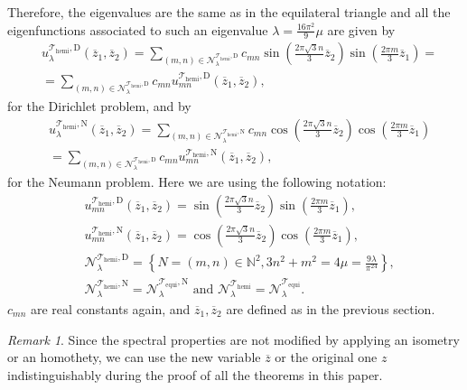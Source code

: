 \documentclass{amsart}
\theoremstyle{definition}
\theoremstyle{remark}
\newtheorem{remark}[theorem]{Remark}
\numberwithin{equation}{section}
\theoremstyle{definition}
\theoremstyle{remark}
\begin{document}
Therefore, the eigenvalues are the same as in the equilateral triangle and all the eigenfunctions associated to such an eigenvalue $\lambda=\frac{16\pi^2}{9}\mu$ are given by
\begin{equation}
	\begin{aligned}
		&	u_\lambda^{\mathcal{T}_\mathrm{hemi},\mathrm{D}}\left(\overline{z}_1,\overline{z}_2\right)=\sum_{(m,n)\in	\mathcal{N}_\lambda^{\mathcal{T}_\mathrm{hemi},\mathrm{D}}}c_{mn}\sin\left(\frac{2\pi\sqrt{3}n}{3}\overline{z}_2\right)\sin\left(\frac{2\pi m}{3}\overline{z}_1\right)=\\&=\sum_{(m,n)\in	\mathcal{N}_\lambda^{\mathcal{T}_\mathrm{hemi},\mathrm{D}}}c_{mn}u_{mn}^{\mathcal{T}_\mathrm{hemi},\mathrm{D}}\left(\overline{z}_1,\overline{z}_2\right),
	\end{aligned}
\end{equation}for the Dirichlet problem, and by 
\begin{equation}
	\begin{aligned}
		&	u_\lambda^{\mathcal{T}_\mathrm{hemi},\mathrm{N}}\left(\overline{z}_1,\overline{z}_2\right)=\sum_{(m,n)\in	\mathcal{N}_\lambda^{\mathcal{T}_\mathrm{hemi},\mathrm{N}}}c_{mn}\cos\left(\frac{2\pi\sqrt{3}n}{3}\overline{z}_2\right)\cos\left(\frac{2\pi m}{3}\overline{z}_1\right)\\&=\sum_{(m,n)\in	\mathcal{N}_\lambda^{\mathcal{T}_\mathrm{hemi},\mathrm{D}}}c_{mn}u_{mn}^{\mathcal{T}_\mathrm{hemi},\mathrm{N}}\left(\overline{z}_1,\overline{z}_2\right),
	\end{aligned}
\end{equation} for the Neumann problem.
Here we are using the following notation:\begin{equation}
	\begin{aligned}
		&	u_{mn}^{\mathcal{T}_\mathrm{hemi},\mathrm{D}}\left(\overline{z}_1,\overline{z}_2\right)=	\sin\left(\frac{2\pi\sqrt{3}n}{3}\overline{z}_2\right)\sin\left(\frac{2\pi m}{3}\overline{z}_1\right),\\&	u_{mn}^{\mathcal{T}_\mathrm{hemi},\mathrm{N}}\left(\overline{z}_1,\overline{z}_2\right)=	\cos\left(\frac{2\pi\sqrt{3}n}{3}\overline{z}_2\right)\cos\left(\frac{2\pi m}{3}\overline{z}_1\right),\\&\mathcal{N}_\lambda^{\mathcal{T}_\mathrm{hemi},\mathrm{D}}=\left\{N=(m,n)\in\mathbb{N}^2, 3n^2+m^2=4\mu=\frac{9\lambda}{\pi^24}\right\},\\&\mathcal{N}_\lambda^{\mathcal{T}_\mathrm{hemi},\mathrm{N}}=\mathcal{N}_\lambda^{\mathcal{T}_{\mathrm{equi}},\mathrm{N}}\text{ and }\mathcal{N}_\lambda^{\mathcal{T}_\mathrm{hemi}}=\mathcal{N}_\lambda^{\mathcal{T}_{\mathrm{equi}}}.
	\end{aligned}
\end{equation}$c_{mn}$ are real constants again, and $\overline{z}_1,\overline{z}_2$ are defined as in the previous section. 
\begin{remark}
	Since the spectral properties are not modified by applying an isometry or an homothety, we can use the new variable $\overline{z}$ or the original one $z$ indistinguishably during the proof of all the theorems in this paper.  
\end{remark}
\end{document}
